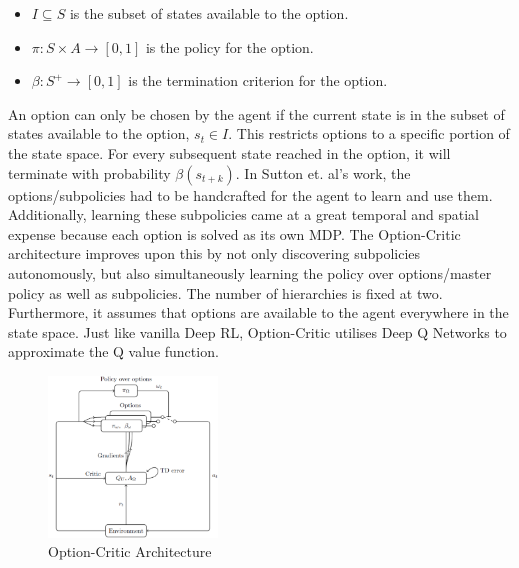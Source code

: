 \documentclass[notitlepage,a4paper,11pt]{article}
\begin{document}
\begin{itemize}[noitemsep]
	\itemsep0em
	\item $I \subseteq S$ is the subset of states available to the option.
	\item $\pi : S \times A \to [0,1]$ is the policy for the option.
	\item $\beta : S^+ \to [0,1]$ is the termination criterion for the option.
\end{itemize}

An option can only be chosen by the agent if the current state is in the subset of states available to the option, $s_t \in I$. This restricts options to a specific portion of the state space. For every subsequent state reached in the option, it will terminate with probability $\beta(s_{t+k})$. In Sutton et. al's work, the options/subpolicies had to be handcrafted for the agent to learn and use them. Additionally, learning these subpolicies came at a great temporal and spatial expense because each option is solved as its own MDP. The Option-Critic architecture \cite{bacon2017option} improves upon this by not only discovering subpolicies autonomously, but also simultaneously learning the policy over options/master policy as well as subpolicies. The number of hierarchies is fixed at two. Furthermore, it assumes that options are available to the agent everywhere in the state space. Just like vanilla Deep RL, Option-Critic utilises Deep Q Networks to approximate the Q value function.



\begin{figure}
	\vspace{-20pt}
	\begin{center}
		\includegraphics[width=0.4\textwidth]{figs/option_critic_architecture.eps}
	\end{center}
	\vspace{-20pt}
\caption{Option-Critic Architecture \protect\cite{ribas2011neural}} \label{fig:4}
\end{figure}
\end{document}
